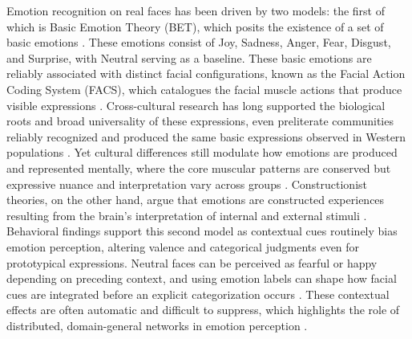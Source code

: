 Emotion recognition on real faces has been driven by two models: the first of which is Basic Emotion Theory (BET), which posits the existence of a set of basic emotions \citep{ekman1971constants}. 
These emotions consist of Joy, Sadness, Anger, Fear, Disgust, and Surprise, with Neutral serving as a baseline. 
These basic emotions are reliably associated with distinct facial configurations, known as the Facial Action Coding System (FACS), which catalogues the facial muscle actions that produce visible expressions \citep{ekman1978facial}.
Cross-cultural research has long supported the biological roots and broad universality of these expressions, even preliterate communities reliably recognized and produced the same basic expressions observed in Western populations \citep{matsumoto_half-century_2022}.
Yet cultural differences still modulate how emotions are produced and represented mentally, where the core muscular patterns are conserved but expressive nuance and interpretation vary across groups \citep{jack_facial_2012, ruttkay_cultural_2009}.
Constructionist theories, on the other hand, argue that emotions are constructed experiences resulting from the brain's interpretation of internal and external stimuli \citep{barrett_solving_2006, lindquist_brain_2012}.
Behavioral findings support this second model as contextual cues routinely bias emotion perception, altering valence and categorical judgments even for prototypical expressions.
Neutral faces can be perceived as fearful or happy depending on preceding context, and using emotion labels can shape how facial cues are integrated before an explicit categorization occurs \citep{calbi_how_2017, brooks_conceptual_2018}.
These contextual effects are often automatic and difficult to suppress, which highlights the role of distributed, domain-general networks in emotion perception \citep{aviezer_automaticity_2011, lee_context_2012}.

